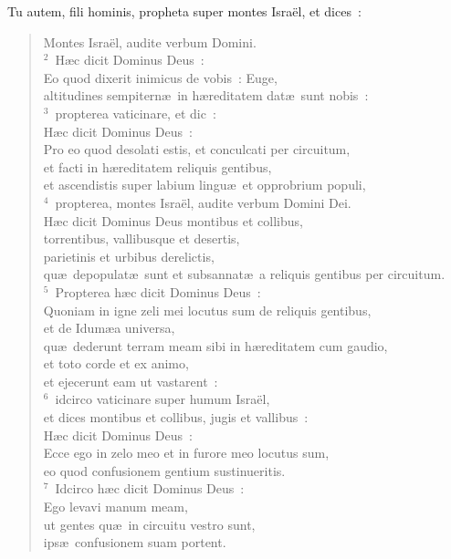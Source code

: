\bchapter
\lettrine[lines=3,image=true,loversize=0.05,lraise=-0.03]{T}{}u autem, fili hominis, propheta super montes Isra\"el, et dices~: \begin{flushleft}\begin{verse}\vspace{6pt}Montes Isra\"el, audite verbum Domini.\\
${}^{2}$~H\ae c dicit Dominus Deus~:\\ Eo quod dixerit inimicus de vobis~: Euge,\\ altitudines sempitern\ae\ in h\ae reditatem dat\ae\ sunt nobis~:\\
${}^{3}$~propterea vaticinare, et dic~:\\ H\ae c dicit Dominus Deus~:\\ Pro eo quod desolati estis, et conculcati per circuitum,\\ et facti in h\ae reditatem reliquis gentibus,\\ et ascendistis super labium lingu\ae\ et opprobrium populi,\\
${}^{4}$~propterea, montes Isra\"el, audite verbum Domini Dei.\\ H\ae c dicit Dominus Deus montibus et collibus,\\ torrentibus, vallibusque et desertis,\\ parietinis et urbibus derelictis,\\ qu\ae\ depopulat\ae\ sunt et subsannat\ae\ a reliquis gentibus per circuitum.\\
${}^{5}$~Propterea h\ae c dicit Dominus Deus~:\\ Quoniam in igne zeli mei locutus sum de reliquis gentibus,\\ et de Idum\ae a universa,\\ qu\ae\ dederunt terram meam sibi in h\ae reditatem cum gaudio,\\ et toto corde et ex animo,\\ et ejecerunt eam ut vastarent~:\\
${}^{6}$~idcirco vaticinare super humum Isra\"el,\\ et dices montibus et collibus, jugis et vallibus~:\\ H\ae c dicit Dominus Deus~:\\ Ecce ego in zelo meo et in furore meo locutus sum,\\ eo quod confusionem gentium sustinueritis.\\
${}^{7}$~Idcirco h\ae c dicit Dominus Deus~:\\ Ego levavi manum meam,\\ ut gentes qu\ae\ in circuitu vestro sunt,\\ ips\ae\ confusionem suam portent.\\

\end{verse}
\end{flushleft}
